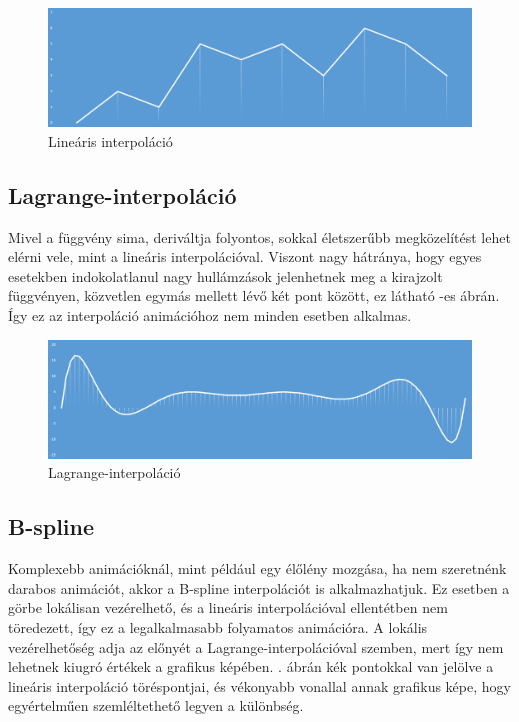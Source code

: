 \begin{figure}[h]
\centering
\includegraphics[scale=0.43]{kepek/linear_interpol.png}
\caption{Lineáris interpoláció}
\label{fig:linear}
\end{figure}

\subsection{Lagrange-interpoláció}

Mivel a függvény sima, deriváltja folyontos, sokkal életszerűbb megközelítést lehet elérni vele, mint a lineáris interpolációval. Viszont nagy hátránya, hogy egyes esetekben indokolatlanul nagy hullámzások jelenhetnek meg a kirajzolt függvényen, közvetlen egymás mellett lévő két pont között, ez látható -es ábrán. Így ez az interpoláció animációhoz nem minden esetben alkalmas.

\begin{figure}[h]
\centering
\includegraphics[scale=0.43]{kepek/non_linear_interpol.png}
\caption{Lagrange-interpoláció}
\label{fig:lagrange}
\end{figure}

\subsection{B-spline}

Komplexebb animációknál, mint például egy élőlény mozgása, ha nem szeretnénk darabos animációt, akkor a B-spline interpolációt is alkalmazhatjuk. Ez esetben a görbe lokálisan vezérelhető, és a lineáris interpolációval ellentétben nem töredezett, így ez a legalkalmasabb folyamatos animációra. A lokális vezérelhetőség adja az előnyét a Lagrange-interpolációval szemben, mert így nem lehetnek kiugró értékek a grafikus képében. . ábrán kék pontokkal van jelölve a lineáris interpoláció töréspontjai, és vékonyabb vonallal annak grafikus képe, hogy egyértelműen szemléltethető legyen a különbség.

